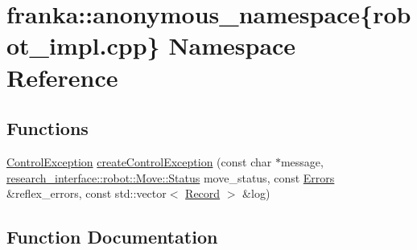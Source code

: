 \hypertarget{namespacefranka_1_1anonymous__namespace_02robot__impl_8cpp_03}{}\section{franka\+:\+:anonymous\+\_\+namespace\{robot\+\_\+impl.\+cpp\} Namespace Reference}
\label{namespacefranka_1_1anonymous__namespace_02robot__impl_8cpp_03}
\subsection*{Functions}
\begin{DoxyCompactItemize}
\item 
\hyperlink{structfranka_1_1ControlException}{Control\+Exception} \hyperlink{namespacefranka_1_1anonymous__namespace_02robot__impl_8cpp_03_ad774a35737682bade54336046f9d09b2}{create\+Control\+Exception} (const char $\ast$message, \hyperlink{structresearch__interface_1_1robot_1_1Move_a74e15d249324a1b2d28f0a7cf50dc794}{research\+\_\+interface\+::robot\+::\+Move\+::\+Status} move\+\_\+status, const \hyperlink{structfranka_1_1Errors}{Errors} \&reflex\+\_\+errors, const std\+::vector$<$ \hyperlink{structfranka_1_1Record}{Record} $>$ \&log)
\end{DoxyCompactItemize}


\subsection{Function Documentation}
\mbox{\label{namespacefranka_1_1anonymous__namespace_02robot__impl_8cpp_03_ad774a35737682bade54336046f9d09b2}} 
